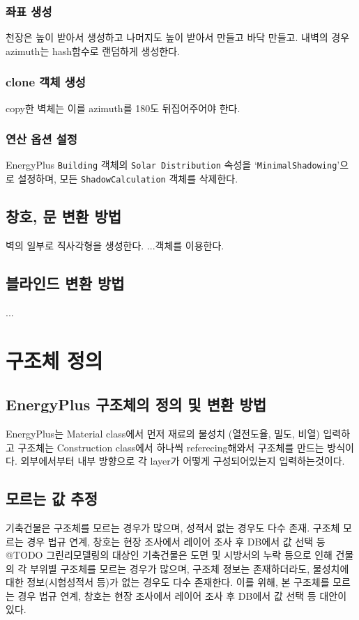 \subsubsection{좌표 생성}
천장은 높이 받아서 생성하고 나머지도 높이 받아서 만들고 바닥 만들고.
내벽의 경우 azimuth는 hash함수로 랜덤하게 생성한다. 

\subsubsection{clone 객체 생성}
copy한 벽체는 이를 azimuth를 180도 뒤집어주어야 한다.

\subsubsection{연산 옵션 설정}
EnergyPlus \texttt{Building} 객체의 \texttt{Solar Distribution} 속성을 `\texttt{MinimalShadowing}'으로 설정하며, 모든 \texttt{ShadowCalculation} 객체를 삭제한다.

\subsection{창호, 문 변환 방법}
벽의 일부로 직사각형을 생성한다.  ...객체를 이용한다.

\subsection{블라인드 변환 방법}
...


\section{구조체 정의}
\subsection{EnergyPlus 구조체의 정의 및 변환 방법}
EnergyPlus는 Material class에서 먼저 재료의 물성치 (열전도율, 밀도, 비열) 입력하고 구조체는 Construction class에서 하나씩 referecing해와서 구조체를 만드는 방식이다.
외부에서부터 내부 방향으로 각 layer가 어떻게 구성되어있는지 입력하는것이다.

\subsection{모르는 값 추정}
기축건물은 구조체를 모르는 경우가 많으며, 성적서 없는 경우도 다수 존재.
구조체 모르는 경우 법규 연계, 창호는 현장 조사에서 레이어 조사 후 DB에서 값 선택 등 @TODO
그린리모델링의 대상인 기축건물은 도면 및 시방서의 누락 등으로 인해 건물의 각 부위별 구조체를 모르는 경우가 많으며, 구조체 정보는 존재하더라도, 물성치에 대한 정보(시험성적서 등)가 없는 경우도 다수 존재한다. 이를 위해, 본  구조체를 모르는 경우 법규 연계, 창호는 현장 조사에서 레이어 조사 후 DB에서 값 선택 등 대안이 있다.


